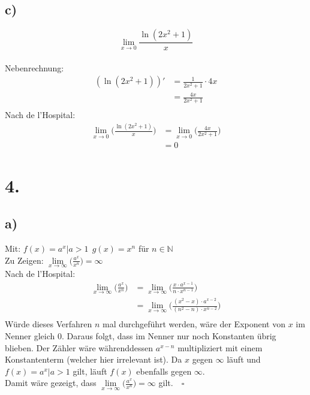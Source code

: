 \documentclass[a4paper]{scrartcl}
\newcommand{\qed}{\quad \square}
\begin{document}
\subsection{c)}
\[\lim_{x\to 0} \frac {\ln(2x^2 + 1)} {x}\] \\
Nebenrechnung: 
\begin{align}
(\ln(2x^2 + 1))' &= \frac{1}{2x^2 + 1} \cdot 4x\\ 
	&= \frac{4x}{2x^2 +1} \\
\end{align}
Nach de l'Hospital:
\begin{align}
\lim_{x\to 0} \bigg(\frac {\ln(2x^2 + 1)} {x}\bigg) &= \lim_{x\to 0} \bigg(\frac{4x} {2x^2 + 1}\bigg) \\
	&= 0
\end{align}
\newpage
\section{4.}
\subsection{a)}
Mit: \(f(x)=a^x |a>1\ \ g(x)=x^n\) für \(n\in \mathbb{N}\)\\
Zu Zeigen: \(\lim\limits_{x\to\infty}\bigg(\frac{a^x}{x^n}\bigg)=\infty\)\\
Nach de l'Hospital:
\begin{align}
\lim\limits_{x\to\infty}\bigg(\frac{a^x}{x^n}\bigg)&=\lim\limits_{x\to\infty}\bigg(\frac{x\cdot a^{x-1}}{n\cdot x^{n-1}}\bigg)\\
	&=\lim\limits_{x\to\infty}\bigg(\frac{(x^2-x)\cdot a^{x-2}}{(n^2-n)\cdot x^{n-2}}\bigg)\\
\end{align}
Würde dieses Verfahren \(n\) mal durchgeführt werden, wäre der Exponent von \(x\) im Nenner gleich 0. Daraus folgt, dass im Nenner nur noch Konstanten übrig blieben. Der Zähler wäre währenddessen \(a^{x-n}\) multipliziert mit einem Konstantenterm (welcher hier irrelevant ist). Da \(x\) gegen  \(\infty\) läuft und \(f(x)=a^x|a>1\) gilt, läuft \(f(x)\) ebenfalls gegen \(\infty\).\\
Damit wäre gezeigt, dass \(\lim\limits_{x\to\infty}\bigg(\frac{a^x}{x^n}\bigg)=\infty\) gilt.\(\qed\)
\end{document}
